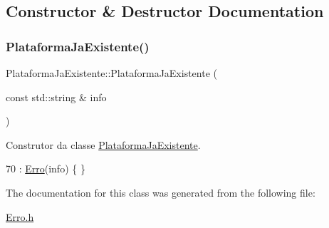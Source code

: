 \subsection{Constructor \& Destructor Documentation}
\mbox{\label{classPlataformaJaExistente_a471bf73973470d778c2442a8adc17e89}} 
\subsubsection{\texorpdfstring{Plataforma\+Ja\+Existente()}{PlataformaJaExistente()}}
{\footnotesize\ttfamily Plataforma\+Ja\+Existente\+::\+Plataforma\+Ja\+Existente (\begin{DoxyParamCaption}\item[{const std\+::string \&}]{info }\end{DoxyParamCaption})\hspace{0.3cm}{\ttfamily [inline]}}



Construtor da classe \hyperlink{classPlataformaJaExistente}{Plataforma\+Ja\+Existente}. 


\begin{DoxyCode}
70 : \hyperlink{classErro_a15d79796bd17517ff05d45eee55556f1}{Erro}(info) \{ \}
\end{DoxyCode}


The documentation for this class was generated from the following file\+:\begin{DoxyCompactItemize}
\item 
\hyperlink{Erro_8h}{Erro.\+h}\end{DoxyCompactItemize}
